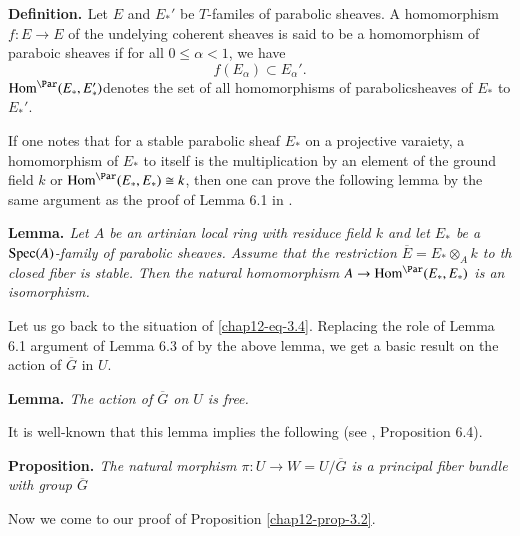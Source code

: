 \medskip
\noindent
{\bfseries {} Definition. \label{chap12-definition-3.6}}  Let $E$ and $E_{*}'$ be $T$-familes of parabolic sheaves. A homomorphism $f: E \rightarrow E$ of the undelying coherent sheaves is said to be a homomorphism of paraboic sheaves if for all $0 \leq \alpha < 1$, we have
$$
f(E_{\alpha}) \subset E_{\alpha}'.
$$
$\Hom^{\Par}(E_{*}, E_{*}')$\pageoriginale denotes the set of all homomorphisms of parabolic\break sheaves of $E_{*}$ to $E_{*}'$.

If one notes that for a stable parabolic sheaf $E_{*}$ on a projective varaiety, a homomorphism of $E_{*}$ to itself is the multiplication by an element of the ground field $k$ or $\Hom^{\Par}(E_{*}, E_{*}) \cong k$, then one can prove the following lemma by the same argument as the proof of Lemma 6.1 in \cite{chap12-key5}.

\medskip
\noindent
{\bfseries {} Lemma. \label{chap12-Lemma-3.7}} \textit{Let $A$ be an artinian local ring with residuce field $k$ and let $E_{*}$ be a $\operatorname{Spec}(A)$-family of parabolic sheaves. Assume that the restriction $\overline{E}=E_{*}\otimes_{A} k$ to th closed fiber is stable. Then the natural homomorphism $A\rightarrow \Hom^{\Par}(E_{*}, E_{*})$ is an isomorphism.}

 Let us  go back to the situation of \eqref{chap12-eq-3.4}. Replacing the role of Lemma 6.1 argument of Lemma 6.3 of
 \cite{chap12-key5} by the above lemma, we get a basic result on the action of $\overline{G}$ in $U$.

\medskip
\noindent
{\bfseries {} Lemma. \label{chap12-Lemma-3.8}}\textit{The action of $\overline{G}$ on $U$ is free.}

 It is well-known that this lemma implies the following (see \cite{chap12-key5}, Proposition 6.4).

\medskip
\noindent
{\bfseries {} Proposition. \label{chap12-prop-3.9}}\textit{The natural morphism
$\pi : U \rightarrow W = U/\overline{G}$ is a principal fiber bundle with group $\overline{G}$}

Now we come to our proof of Proposition \ref{chap12-prop-3.2}.

